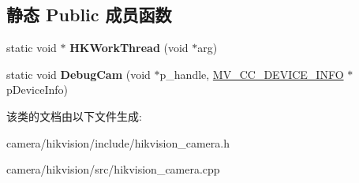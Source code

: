 \subsection*{静态 Public 成员函数}
\begin{DoxyCompactItemize}
\item 
\mbox{\label{classcamera_1_1_hik_camera_a40bb96bd7e575f346040d42632aa9e65}} 
static void $\ast$ {\bfseries H\+K\+Work\+Thread} (void $\ast$arg)
\item 
\mbox{\label{classcamera_1_1_hik_camera_ab1b6ac6f8b9391eb66e21e0b567bbd06}} 
static void {\bfseries Debug\+Cam} (void $\ast$p\+\_\+handle, \hyperlink{struct___m_v___c_c___d_e_v_i_c_e___i_n_f_o__}{M\+V\+\_\+\+C\+C\+\_\+\+D\+E\+V\+I\+C\+E\+\_\+\+I\+N\+FO} $\ast$p\+Device\+Info)
\end{DoxyCompactItemize}


该类的文档由以下文件生成\+:\begin{DoxyCompactItemize}
\item 
camera/hikvision/include/hikvision\+\_\+camera.\+h\item 
camera/hikvision/src/hikvision\+\_\+camera.\+cpp\end{DoxyCompactItemize}

